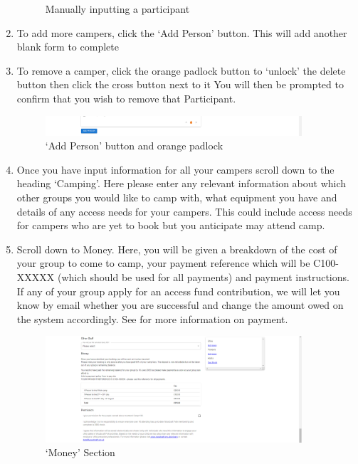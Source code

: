 \documentclass[a4paper, 11pt]{report}
\begin{document}
\begin{enumerate}
\begin{figure}[H]
        \caption{Manually inputting a participant}
    \end{figure}
    \item To add more campers, click the `Add Person' button. This will add another blank form to complete
    \item To remove a camper, click the orange padlock button to `unlock' the delete button then click the cross button next to it You will then be prompted to confirm that you wish to remove that Participant.
    \begin{figure}[H]
        \centering
        \includegraphics[width=0.9\textwidth]{assets/2-add-person-button.png}
        \caption{`Add Person' button and orange padlock}
    \end{figure}
    \item \label{everyone-steps}Once you have input information for all your campers scroll down to the heading `Camping'. Here please enter any relevant information about which other groups you would like to camp with, what equipment you have and details of any access needs for your campers. This could include access needs for campers who are yet to book but you anticipate may attend camp. 
    \item Scroll down to Money. Here, you will be given a breakdown of the cost of your group to come to camp, your payment reference which will be C100-XXXXX (which should be used for all payments) and payment instructions. If any of your group apply for an access fund contribution, we will let you know by email whether you are successful and change the amount owed on the system accordingly. See  for more information on payment. 
    \begin{figure}[H]
        \centering
        \includegraphics[width=0.9\textwidth]{assets/2-money.png}
        \caption{`Money' Section}
    \end{figure}

\end{enumerate}
\end{document}
